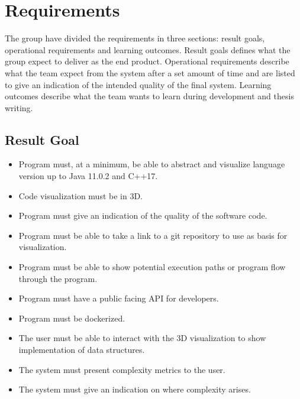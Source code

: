 \chapter{Requirements}
\label{chap:requirements}

The group have divided the requirements in three sections: result goals, operational requirements and learning outcomes. Result goals defines what the group expect to deliver as the end product. Operational requirements describe what the team expect from the system after a set amount of time and are listed to give an indication of the intended quality of the final system. Learning outcomes describe what the team wants to learn during development and thesis writing.

\section{Result Goal}
    \begin{itemize}
        \item Program must, at a minimum, be able to abstract and visualize language version up to Java 11.0.2 and C++17.
        \item Code visualization must be in 3D.
        \item Program must give an indication of the quality of the software code.  
        \item Program must be able to take a link to a git repository to use as basis for visualization.
        \item Program must be able to show potential execution paths or program flow through the program.
        \item Program must have a public facing API for developers.
        \item Program must be dockerized. 
        \item The user must be able to interact with the 3D visualization to show implementation of data structures.
        \item The system must present complexity metrics to the user.
        \item The system must give an indication on where complexity arises.
    \end{itemize}
    
